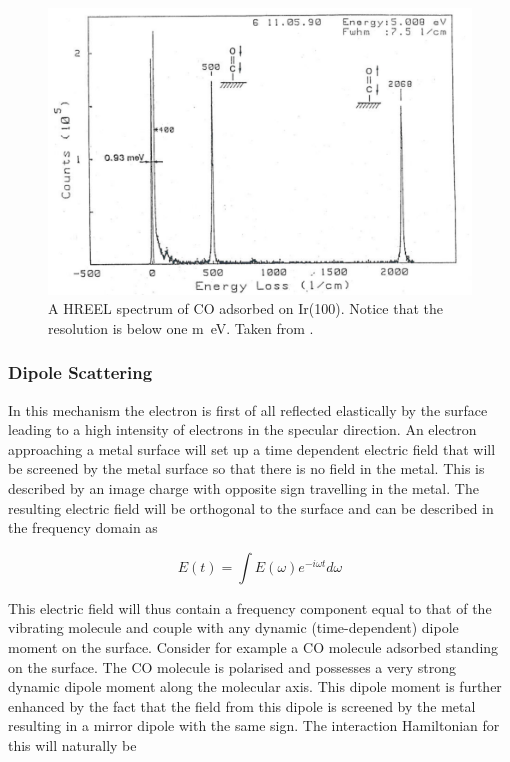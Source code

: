 \begin{figure}[h!]
	\begin{center}
	\includegraphics[scale=4]{figures/08_02.png}
	\caption{A HREEL spectrum of CO adsorbed on Ir(100). Notice that the resolution is below one \si{m\electronvolt}. Taken from \cite{Bruckmann}.}
	\label{fig:cohreels}
	\end{center}
\end{figure}

\subsubsection{Dipole Scattering}
In this mechanism the electron is first of all reflected elastically by the surface leading to a high intensity of electrons in the specular direction. An electron approaching a metal surface will set up a time dependent electric field that will be screened by the metal surface so that there is no field in the metal. This is described by an image charge with opposite sign travelling in the metal. The resulting electric field will be orthogonal to the surface and can be described in the frequency domain as

\begin{equation}
E(t)=\int E(\omega)e^{-i\omega t}d\omega
\end{equation}

This electric field will thus contain a frequency component equal to that of the vibrating molecule and couple with any dynamic (time-dependent) dipole moment on the surface. Consider for example a CO molecule adsorbed standing on the surface. The  CO molecule is polarised and possesses a very strong dynamic  dipole moment along the molecular axis. This dipole moment is further enhanced by the fact that the field from this dipole is screened by the metal resulting in a mirror dipole with the same sign. The interaction Hamiltonian for this will naturally be

